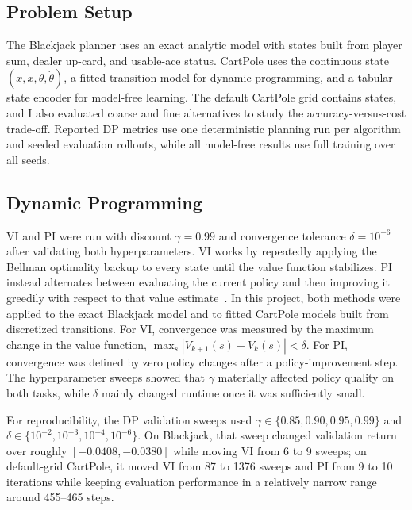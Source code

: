 \documentclass[letterpaper, 10 pt, conference]{ieeeconf}
\begin{document}
\subsection{Problem Setup}

The Blackjack planner uses an exact analytic model with \BJNStates states built from player sum, dealer up-card, and usable-ace status. CartPole uses the continuous state $(x, \dot{x}, \theta, \dot{\theta})$, a fitted transition model for dynamic programming, and a tabular state encoder for model-free learning. The default CartPole grid contains \CPDefaultNStates states, and I also evaluated coarse and fine alternatives to study the accuracy-versus-cost trade-off. Reported DP metrics use one deterministic planning run per algorithm and \NumSeeds seeded evaluation rollouts, while all model-free results use full training over all \NumSeeds seeds.

\subsection{Dynamic Programming}

VI and PI were run with discount $\gamma = 0.99$ and convergence tolerance $\delta = 10^{-6}$ after validating both hyperparameters. VI works by repeatedly applying the Bellman optimality backup to every state until the value function stabilizes. PI instead alternates between evaluating the current policy and then improving it greedily with respect to that value estimate~\cite{sutton2018reinforcement}. In this project, both methods were applied to the exact Blackjack model and to fitted CartPole models built from discretized transitions. For VI, convergence was measured by the maximum change in the value function, $\max_s |V_{k+1}(s) - V_k(s)| < \delta$. For PI, convergence was defined by zero policy changes after a policy-improvement step. The hyperparameter sweeps showed that $\gamma$ materially affected policy quality on both tasks, while $\delta$ mainly changed runtime once it was sufficiently small.

For reproducibility, the DP validation sweeps used $\gamma \in \{0.85, 0.90, 0.95, 0.99\}$ and $\delta \in \{10^{-2}, 10^{-3}, 10^{-4}, 10^{-6}\}$. On Blackjack, that sweep changed validation return over roughly $[-0.0408, -0.0380]$ while moving VI from 6 to 9 sweeps; on default-grid CartPole, it moved VI from 87 to 1376 sweeps and PI from 9 to 10 iterations while keeping evaluation performance in a relatively narrow range around 455--465 steps.
\end{document}
